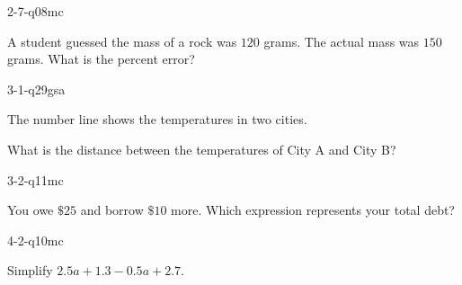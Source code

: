 \begin{practiceQuestion}{2-7-q08}{mc}
\begin{questionText}
A student guessed the mass of a rock was $120$ grams. The actual mass was $150$ grams. What is the percent error?
\end{questionText}
\end{practiceQuestion}

\begin{practiceQuestion}{3-1-q29}{gsa}
\begin{questionText}
The number line shows the temperatures in two cities.

\begin{center}
\end{center}

What is the distance between the temperatures of City A and City B?
\end{questionText}
\end{practiceQuestion}

\begin{practiceQuestion}{3-2-q11}{mc}
\begin{questionText}
You owe $\$25$ and borrow $\$10$ more. Which expression represents your total debt?
\end{questionText}
\end{practiceQuestion}

\begin{practiceQuestion}{4-2-q10}{mc}
\begin{questionText}
Simplify $2.5a + 1.3 - 0.5a + 2.7$.
\end{questionText}
\end{practiceQuestion}

